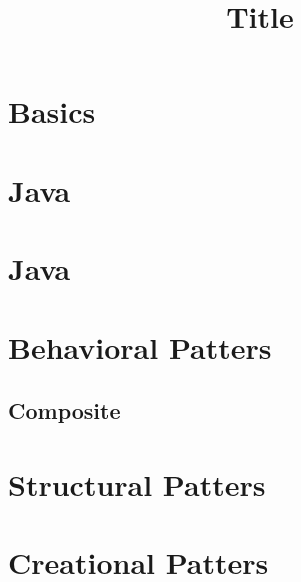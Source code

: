 \documentclass[fourColumns]{formularyETH/formularyETH}
\title{Title}
\begin{document}
	
	
\section{Basics}
  
  \newpage
\section{Java}

% 	
% 	
%   
% 	
\newpage
\section{Java}
  
\newpage
\section{Behavioral Patters}
\label{subsubsec:Behavirol}
\subsection{Composite}
  
\section{Structural Patters}
\label{subsubsec:Behavirol}
\section{Creational Patters}
\label{subsubsec:Behavirol}

  
\end{document}
